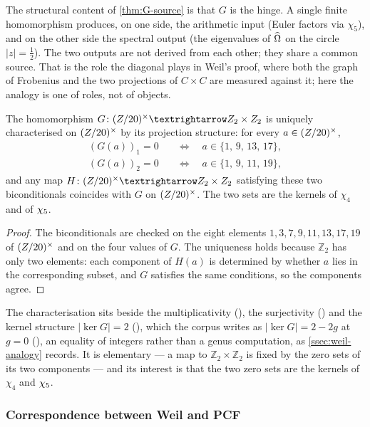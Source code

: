 The structural content of \cref{thm:G-source} is that $G$ is the
hinge.  A single finite homomorphism produces, on one side, the
arithmetic input (Euler factors via $\chi_5$), and on the other
side the spectral output (the eigenvalues of $\widehat{\Omega}$ on the circle $|z|=\tfrac12$).
The two outputs are not derived from each other; they share a common source.  That is
the role the diagonal plays in Weil's proof, where both the graph of Frobenius and the
two projections of $C\times C$ are measured against it; here the analogy is one of
roles, not of objects.

\begin{proposition}
\label{prop:G-characterisation}
The homomorphism $G\colon\Zst\to\mathbb{Z}_2\times\mathbb{Z}_2$
is uniquely characterised on $(Z/20)^{\times}$ by its projection structure:
for every $a\in(Z/20)^{\times}$,
\begin{align*}
  (G(a))_1 = 0 \quad &\Longleftrightarrow\quad
    a \in \{1,\,9,\,13,\,17\}, \\
  (G(a))_2 = 0 \quad &\Longleftrightarrow\quad
    a \in \{1,\,9,\,11,\,19\},
\end{align*}
and any map $H\colon\Zst\to\mathbb{Z}_2\times\mathbb{Z}_2$
satisfying these two biconditionals coincides with $G$ on $(Z/20)^{\times}$.  The two sets are the kernels of
$\chi_4$ and of $\chi_5$.
%
\end{proposition}
\begin{proof}
The biconditionals are checked on the eight elements $1,3,7,9,11,13,17,19$ of $(Z/20)^{\times}$ and on
the four values of $G$.  The uniqueness holds because $\mathbb{Z}_2$ has only two elements: each component of
$H(a)$ is determined by whether $a$ lies in the corresponding subset, and $G$ satisfies the same conditions, so the
components agree.
\end{proof}

The characterisation sits beside the multiplicativity (), the surjectivity
() and the kernel structure $|\ker G| = 2$ (), which the
corpus writes as $|\ker G| = 2 - 2g$ at $g = 0$ (), an equality of
integers rather than a genus computation, as \cref{ssec:weil-analogy} records.  It is elementary --- a map to
$\mathbb{Z}_2\times\mathbb{Z}_2$ is fixed by the zero sets of its two components --- and
its interest is that the two zero sets are the kernels of $\chi_4$ and $\chi_5$.

\subsubsection{Correspondence between Weil and PCF}\label{ssec:correspondence}

